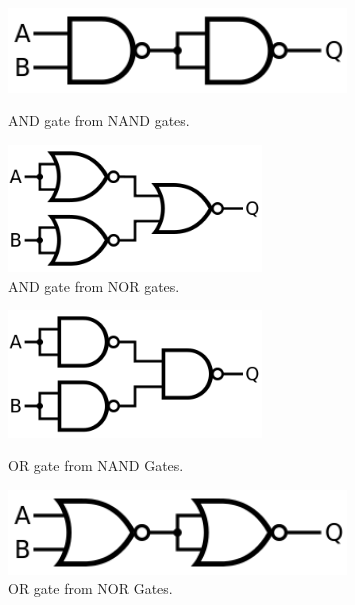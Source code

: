     \begin{figure}[H]   
        \begin{minipage}{0.5\textwidth}
            \centering
    	    \includegraphics[width=0.8\textwidth]{figures/circuits/AND_from_NAND.png}
	        \caption{AND gate from NAND gates.}
	        \label{fig:NAND_AND} 
	    \end{minipage}	
        \begin{minipage}{0.5\textwidth}
            \centering
    	    \includegraphics[width=0.6\textwidth]{figures/circuits/AND_from_NOR.png}
            \caption{AND gate from NOR gates.}
            \label{fig:NOR_AND}
        \end{minipage}
    \end{figure}

    \begin{figure}[H]   
        \begin{minipage}{0.5\textwidth}
            \centering
    	    \includegraphics[width=0.6\textwidth]{figures/circuits/OR_from_NAND.png}
	        \caption{OR gate from NAND Gates.}
	        \label{fig:NAND_OR} 
	    \end{minipage}	
        \begin{minipage}{0.5\textwidth}
            \centering
    	    \includegraphics[width=0.8\textwidth]{figures/circuits/OR_from_NOR.png}
            \caption{OR gate from NOR Gates.}
            \label{fig:NOR_OR}
        \end{minipage}
    \end{figure}